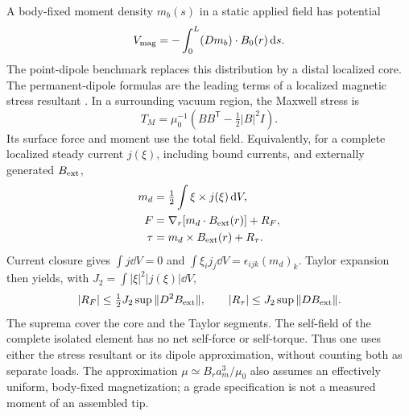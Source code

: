 A body-fixed moment density $m_b(s)$ in a static applied field has
potential
\begin{equation}
 V_{\rm mag}=-\int_0^L (Dm_b)\cdot B_0(r)\,\mathrm d s.
 \label{sm:distributed-magnetism}
\end{equation}
The point-dipole benchmark replaces this distribution by a distal
localized core. The permanent-dipole formulas are the leading terms of
a localized magnetic stress resultant \citep{abbott}. In a surrounding
vacuum region, the Maxwell stress is
\begin{equation}
 T_M=\mu_0^{-1}\left(BB^{\mathsf T}-\tfrac12|B|^2I\right).
 \label{sm:maxwell-stress}
\end{equation}
Its surface force and moment use the total field. Equivalently, for a
complete localized steady current $j(\xi)$, including bound currents,
and externally generated $B_{\rm ext}$,
\begin{align}
 m_d&=\tfrac12\int \xi\times j(\xi)\,\mathrm d V,\nonumber\\
 F&=\nabla_r[m_d\cdot B_{\rm ext}(r)]+R_F,\nonumber\\
 \tau&=m_d\times B_{\rm ext}(r)+R_\tau.
 \label{sm:dipole-expansion}
\end{align}
Current closure gives $\int j\dd V=0$ and
$\int\xi_i j_j\dd V=\epsilon_{ijk}(m_d)_k$.
Taylor expansion then yields, with
$J_2=\int|\xi|^2|j(\xi)|\dd V$,
\begin{equation}
 |R_F|\le\tfrac12J_2\sup\|D^2B_{\rm ext}\|,\qquad
 |R_\tau|\le J_2\sup\|DB_{\rm ext}\|.
 \label{sm:dipole-remainders}
\end{equation}
The suprema cover the core and the Taylor segments. The self-field of
the complete isolated element has no net self-force or self-torque.
Thus one uses either the stress resultant or its dipole approximation,
without counting both as separate loads. The approximation
$\mu\simeq B_ra_m^3/\mu_0$ also assumes an effectively uniform,
body-fixed magnetization; a grade specification is not a measured
moment of an assembled tip.

